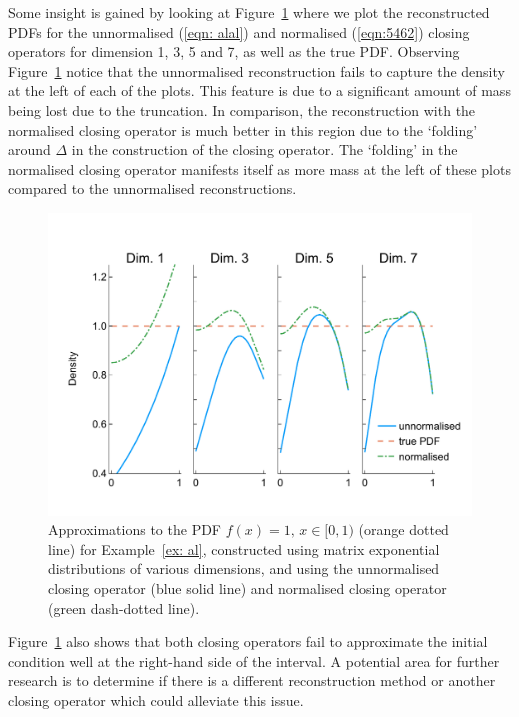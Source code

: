 \begin{example}
Some insight is gained by looking at Figure~\ref{fig: pdf reconstructed} where we plot the reconstructed PDFs for the unnormalised (\ref{eqn: alal}) and normalised (\ref{eqn:5462}) closing operators for dimension 1, 3, 5 and 7, as well as the true PDF. Observing Figure~\ref{fig: pdf reconstructed} notice that the unnormalised reconstruction fails to capture the density at the left of each of the plots. This feature is due to a significant amount of mass being lost due to the truncation. In comparison, the reconstruction with the normalised closing operator is much better in this region due to the `folding' around \(\Delta\) in the construction of the closing operator. The `folding' in the normalised closing operator manifests itself as more mass at the left of these plots compared to the unnormalised reconstructions. %

\begin{figure}[h]
	\centering
	\includegraphics[width=\textwidth,trim={0cm 1.25cm 0cm 1.25cm},clip]{chapter6/figs/qbdrap_closing_vec/fun4/pdfs_formatted.pdf}
	\caption{Approximations to the PDF \(f(x)=1,\, x\in[0,1)\) (orange dotted line) for Example~\ref{ex: al}, constructed using matrix exponential distributions of various dimensions, and using the unnormalised closing operator (blue solid line) and normalised closing operator (green dash-dotted line).}
	\label{fig: pdf reconstructed}
\end{figure} 
Figure~\ref{fig: pdf reconstructed} also shows that both closing operators fail to approximate the initial condition well at the right-hand side of the interval. A potential area for further research is to determine if there is a different reconstruction method or another closing operator which could alleviate this issue. 
\end{example}

